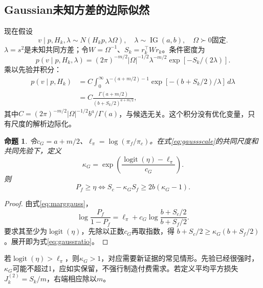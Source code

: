 \documentclass[UTF8,11pt,a4paper,fontset=fandol]{ctexart}
\newcommand{\logit}{\operatorname{logit}}
\newcommand{\IG}{\operatorname{IG}}
\newtheorem{proposition}{命题}[section]
\numberwithin{equation}{section}
\begin{document}
\subsection{Gaussian未知方差的边际似然}
现在假设
\begin{equation}
v\mid p,H_k,\lambda\sim N(H_kp,\lambda\Omega),\quad
\lambda\sim\IG(a,b),\quad \Omega\succ0\text{固定}.
\label{eq:gaussscale}
\end{equation}
$\lambda=s^2$是未知共同方差；令$W=\Omega^{-1}$、$S_k=r_k^\top Wr_k$。条件密度为
\begin{equation}
p(v\mid p,H_k,\lambda)
=(2\pi)^{-m/2}|\Omega|^{-1/2}\lambda^{-m/2}
\exp[-S_k/(2\lambda)].
\end{equation}
乘以先验并积分：
\begin{align}
p(v\mid p,H_k)
&=C\int_0^\infty
\lambda^{-(a+m/2)-1}
\exp[-(b+S_k/2)/\lambda]\,d\lambda\\
&=C\frac{\Gamma(a+m/2)}{(b+S_k/2)^{a+m/2}},
\label{eq:marggauss}
\end{align}
其中$C=(2\pi)^{-m/2}|\Omega|^{-1/2}b^a/\Gamma(a)$，与候选无关。这个积分没有优化变量，只有尺度的解析边际化。

\begin{proposition}\label{prop:gaussratio}
令$c_G=a+m/2$、$\ell_\pi=\log(\pi_f/\pi_c)$。在式\eqref{eq:gaussscale}的共同尺度和共同先验下，定义
\begin{equation}
\kappa_G=\exp\!\left(\frac{\logit(\eta)-\ell_\pi}{c_G}\right).
\end{equation}
则
\begin{equation}
\boxed{P_f\ge\eta\iff S_c-\kappa_GS_f\ge2b(\kappa_G-1).}
\label{eq:gaussratio}
\end{equation}
\end{proposition}
\begin{proof}
由式\eqref{eq:marggauss}，
\[
\log\frac{P_f}{1-P_f}
=\ell_\pi+c_G\log\frac{b+S_c/2}{b+S_f/2}.
\]
要求其至少为$\logit(\eta)$，先除以正数$c_G$再取指数，得
$b+S_c/2\ge\kappa_G(b+S_f/2)$。展开即为式\eqref{eq:gaussratio}。
\end{proof}

若$\logit(\eta)>\ell_\pi$，则$\kappa_G>1$，对应需要新证据的常见情形。先验已经很强时，$\kappa_G$可能不超过1，应如实保留，不强行制造付费需求。若定义平均平方损失$J_k^{(2)}=S_k/m$，右端相应除以$m$。
\end{document}

